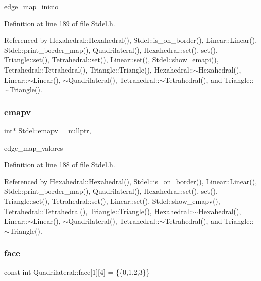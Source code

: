 edge\+\_\+map\+\_\+inicio 



Definition at line 189 of file Stdel.\+h.



Referenced by Hexahedral\+::\+Hexahedral(), Stdel\+::is\+\_\+on\+\_\+border(), Linear\+::\+Linear(), Stdel\+::print\+\_\+border\+\_\+map(), Quadrilateral(), Hexahedral\+::set(), set(), Triangle\+::set(), Tetrahedral\+::set(), Linear\+::set(), Stdel\+::show\+\_\+emapi(), Tetrahedral\+::\+Tetrahedral(), Triangle\+::\+Triangle(), Hexahedral\+::$\sim$\+Hexahedral(), Linear\+::$\sim$\+Linear(), $\sim$\+Quadrilateral(), Tetrahedral\+::$\sim$\+Tetrahedral(), and Triangle\+::$\sim$\+Triangle().

\mbox{\label{classStdel_a39326d0ef108403223402c79b424a41b}} 
\subsubsection{\texorpdfstring{emapv}{emapv}}
{\footnotesize\ttfamily int$\ast$ Stdel\+::emapv = nullptr\hspace{0.3cm}{\ttfamily [protected]}, {\ttfamily [inherited]}}



edge\+\_\+map\+\_\+valores 



Definition at line 188 of file Stdel.\+h.



Referenced by Hexahedral\+::\+Hexahedral(), Stdel\+::is\+\_\+on\+\_\+border(), Linear\+::\+Linear(), Stdel\+::print\+\_\+border\+\_\+map(), Quadrilateral(), Hexahedral\+::set(), set(), Triangle\+::set(), Tetrahedral\+::set(), Linear\+::set(), Stdel\+::show\+\_\+emapv(), Tetrahedral\+::\+Tetrahedral(), Triangle\+::\+Triangle(), Hexahedral\+::$\sim$\+Hexahedral(), Linear\+::$\sim$\+Linear(), $\sim$\+Quadrilateral(), Tetrahedral\+::$\sim$\+Tetrahedral(), and Triangle\+::$\sim$\+Triangle().

\mbox{\label{classQuadrilateral_a2e61e221bbe8816b6b107d0535e1acfb}} 
\subsubsection{\texorpdfstring{face}{face}}
{\footnotesize\ttfamily const int Quadrilateral\+::face\mbox{[}1\mbox{]}\mbox{[}4\mbox{]} = \{\{0,1,2,3\}\}\hspace{0.3cm}{\ttfamily [private]}}



